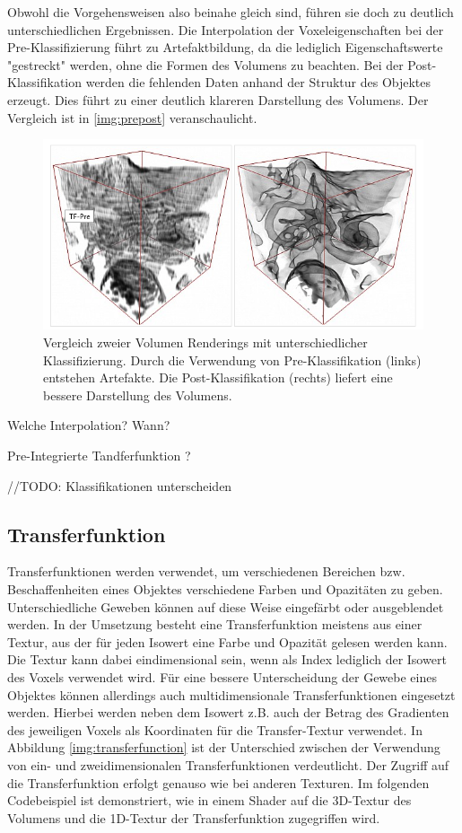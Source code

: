 Obwohl die Vorgehensweisen also beinahe gleich sind, führen sie doch zu deutlich unterschiedlichen Ergebnissen. Die Interpolation der Voxeleigenschaften bei der Pre-Klassifizierung führt zu Artefaktbildung, da die lediglich Eigenschaftswerte "gestreckt" werden, ohne die Formen des Volumens zu beachten. Bei der Post-Klassifikation werden die fehlenden Daten anhand der Struktur des Objektes erzeugt. Dies führt zu einer deutlich klareren Darstellung des Volumens. Der Vergleich ist in \ref{img:prepost} veranschaulicht.

\begin{figure}
	\centering
	\includegraphics[width=0.7\linewidth]{images/prepostclassification.png}
	\caption{Vergleich zweier Volumen Renderings mit unterschiedlicher Klassifizierung. Durch die Verwendung von Pre-Klassifikation (links) entstehen Artefakte. Die Post-Klassifikation (rechts) liefert eine bessere Darstellung des Volumens.}
	\label{img:repost}
\end{figure}

Welche Interpolation? Wann?

Pre-Integrierte Tandferfunktion ? 

//TODO:
Klassifikationen unterscheiden

\subsection{Transferfunktion}

Transferfunktionen werden verwendet, um verschiedenen Bereichen bzw. Beschaffenheiten eines Objektes verschiedene Farben und Opazitäten zu geben. Unterschiedliche Geweben können auf diese Weise eingefärbt oder ausgeblendet werden. In der Umsetzung besteht eine Transferfunktion meistens aus einer Textur, aus der für jeden Isowert eine Farbe und Opazität gelesen werden kann. Die Textur kann dabei eindimensional sein, wenn als Index lediglich der Isowert des Voxels verwendet wird. Für eine bessere Unterscheidung der Gewebe eines Objektes können allerdings auch multidimensionale Transferfunktionen eingesetzt werden. Hierbei werden neben dem Isowert z.B. auch der Betrag des Gradienten des jeweiligen Voxels als Koordinaten für die Transfer-Textur verwendet. In Abbildung \ref{img:transferfunction} ist der Unterschied zwischen der Verwendung von ein- und zweidimensionalen Transferfunktionen verdeutlicht. Der Zugriff auf die Transferfunktion erfolgt genauso wie bei anderen Texturen. Im folgenden Codebeispiel ist demonstriert, wie in einem Shader auf die 3D-Textur des Volumens und die 1D-Textur der Transferfunktion zugegriffen wird. \cite{Fernando04}

